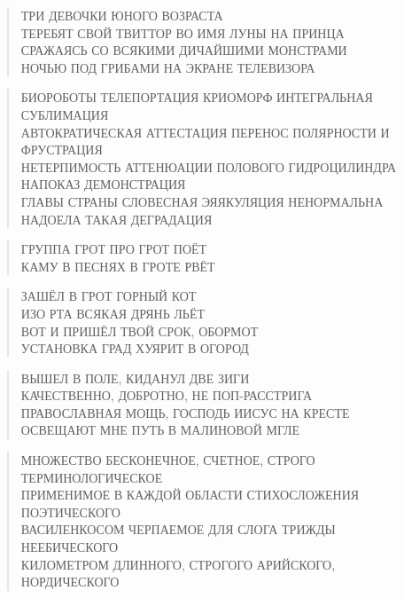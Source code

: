 \poemtitle{***}
\begin{verse}
ТРИ ДЕВОЧКИ ЮНОГО ВОЗРАСТА\\
ТЕРЕБЯТ СВОЙ ТВИТТОР ВО ИМЯ ЛУНЫ НА ПРИНЦА\\
СРАЖАЯСЬ СО ВСЯКИМИ ДИЧАЙШИМИ МОНСТРАМИ\\
НОЧЬЮ ПОД ГРИБАМИ НА ЭКРАНЕ ТЕЛЕВИЗОРА
\end{verse}

\poemtitle{***}
\begin{verse}
БИОРОБОТЫ ТЕЛЕПОРТАЦИЯ КРИОМОРФ ИНТЕГРАЛЬНАЯ СУБЛИМАЦИЯ\\
АВТОКРАТИЧЕСКАЯ АТТЕСТАЦИЯ ПЕРЕНОС ПОЛЯРНОСТИ И ФРУСТРАЦИЯ\\
НЕТЕРПИМОСТЬ АТТЕНЮАЦИИ ПОЛОВОГО ГИДРОЦИЛИНДРА НАПОКАЗ ДЕМОНСТРАЦИЯ\\
ГЛАВЫ СТРАНЫ СЛОВЕСНАЯ ЭЯЯКУЛЯЦИЯ НЕНОРМАЛЬНА НАДОЕЛА ТАКАЯ ДЕГРАДАЦИЯ
\end{verse}

\poemtitle{***}
\begin{verse}
ГРУППА ГРОТ ПРО ГРОТ ПОЁТ\\
КАМУ В ПЕСНЯХ В ГРОТЕ РВЁТ
\end{verse}

\poemtitle{***}
\begin{verse}
ЗАШЁЛ В ГРОТ ГОРНЫЙ КОТ\\
ИЗО РТА ВСЯКАЯ ДРЯНЬ ЛЬЁТ\\
ВОТ И ПРИШЁЛ ТВОЙ СРОК, ОБОРМОТ\\
УСТАНОВКА ГРАД ХУЯРИТ В ОГОРОД
\end{verse}

\poemtitle{***}
\begin{verse}
ВЫШЕЛ В ПОЛЕ, КИДАНУЛ ДВЕ ЗИГИ\\
КАЧЕСТВЕННО, ДОБРОТНО, НЕ ПОП-РАССТРИГА\\
ПРАВОСЛАВНАЯ МОЩЬ, ГОСПОДЬ ИИСУС НА КРЕСТЕ\\
ОСВЕЩАЮТ МНЕ ПУТЬ В МАЛИНОВОЙ МГЛЕ
\end{verse}

\poemtitle{***}
\begin{verse}
МНОЖЕСТВО БЕСКОНЕЧНОЕ, СЧЕТНОЕ, СТРОГО ТЕРМИНОЛОГИЧЕСКОЕ\\
ПРИМЕНИМОЕ В КАЖДОЙ ОБЛАСТИ СТИХОСЛОЖЕНИЯ ПОЭТИЧЕСКОГО\\
ВАСИЛЕНКОСОМ ЧЕРПАЕМОЕ ДЛЯ СЛОГА ТРИЖДЫ НЕЕБИЧЕСКОГО\\
КИЛОМЕТРОМ ДЛИННОГО, СТРОГОГО АРИЙСКОГО, НОРДИЧЕСКОГО
\end{verse}

